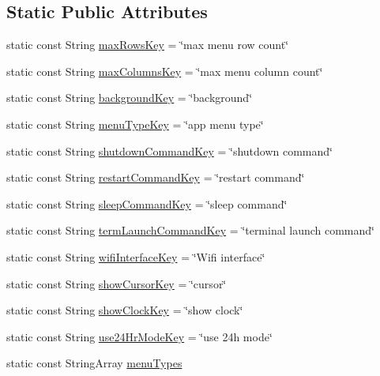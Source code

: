 \subsection*{Static Public Attributes}
\begin{DoxyCompactItemize}
\item 
static const String \mbox{\hyperlink{classMainConfigFile_ac58ef6c74a1bcbbb205ba85057d883e6}{max\+Rows\+Key}} = \char`\"{}max menu row count\char`\"{}
\item 
static const String \mbox{\hyperlink{classMainConfigFile_a31bf45762887a072a47366bdcc52fd0d}{max\+Columns\+Key}} = \char`\"{}max menu column count\char`\"{}
\item 
static const String \mbox{\hyperlink{classMainConfigFile_a3df811f08f3de7ab34f688af16591fad}{background\+Key}} = \char`\"{}background\char`\"{}
\item 
static const String \mbox{\hyperlink{classMainConfigFile_a6efa1f589e99f39a780a23ec60ec44d5}{menu\+Type\+Key}} = \char`\"{}app menu type\char`\"{}
\item 
static const String \mbox{\hyperlink{classMainConfigFile_a932e061dfe0eeb6478eb61fa590caa7a}{shutdown\+Command\+Key}} = \char`\"{}shutdown command\char`\"{}
\item 
static const String \mbox{\hyperlink{classMainConfigFile_a0ac923baebcb7449dd3cbf77be0720db}{restart\+Command\+Key}} = \char`\"{}restart command\char`\"{}
\item 
static const String \mbox{\hyperlink{classMainConfigFile_a2e92489b6a6c5c1f5043490ae1025b27}{sleep\+Command\+Key}} = \char`\"{}sleep command\char`\"{}
\item 
static const String \mbox{\hyperlink{classMainConfigFile_ab13bb4440414df9dc1c958332583c84f}{term\+Launch\+Command\+Key}} = \char`\"{}terminal launch command\char`\"{}
\item 
static const String \mbox{\hyperlink{classMainConfigFile_ab4e4470a18947cb402ecaf9287e453a3}{wifi\+Interface\+Key}} = \char`\"{}Wifi interface\char`\"{}
\item 
static const String \mbox{\hyperlink{classMainConfigFile_a70246b438641864c17eca91c189d1eba}{show\+Cursor\+Key}} = \char`\"{}cursor\char`\"{}
\item 
static const String \mbox{\hyperlink{classMainConfigFile_aec2fa3961a0366b2d947b4ed16779e02}{show\+Clock\+Key}} = \char`\"{}show clock\char`\"{}
\item 
static const String \mbox{\hyperlink{classMainConfigFile_ac8433e4a6b136435be61b9a348abb131}{use24\+Hr\+Mode\+Key}} = \char`\"{}use 24h mode\char`\"{}
\item 
static const String\+Array \mbox{\hyperlink{classMainConfigFile_ab1aa5ad7c36eab3136ce7f5a7227d707}{menu\+Types}}
\end{DoxyCompactItemize}


